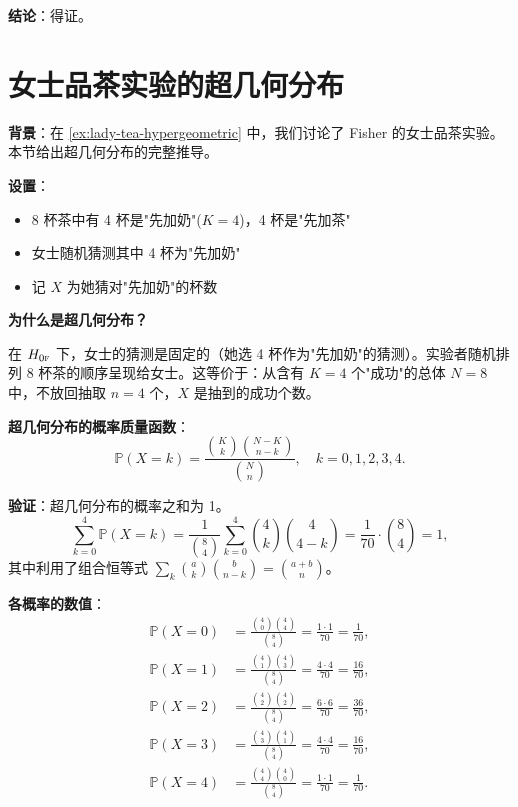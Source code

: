 \textbf{结论}：得证。

\section{女士品茶实验的超几何分布}\label{sec:lady-tea-hypergeometric}\label{ex:lady-tea-hypergeometric}

\textbf{背景}：在 \ref{ex:lady-tea-hypergeometric} 中，我们讨论了 Fisher 的女士品茶实验。本节给出超几何分布的完整推导。

\textbf{设置}：
\begin{itemize}
  \item 8 杯茶中有 4 杯是"先加奶"($K=4$)，4 杯是"先加茶"
  \item 女士随机猜测其中 4 杯为"先加奶"
  \item 记 $X$ 为她猜对"先加奶"的杯数
\end{itemize}

\textbf{为什么是超几何分布？}

在 $H_{0\textsc{f}}$ 下，女士的猜测是固定的（她选 4 杯作为"先加奶"的猜测）。实验者随机排列 8 杯茶的顺序呈现给女士。这等价于：从含有 $K=4$ 个"成功"的总体 $N=8$ 中，不放回抽取 $n=4$ 个，$X$ 是抽到的成功个数。

\textbf{超几何分布的概率质量函数}：
\[
\mathbb{P}(X = k) = \frac{\binom{K}{k} \binom{N-K}{n-k}}{\binom{N}{n}}, \quad k = 0, 1, 2, 3, 4 .
\]

\textbf{验证}：超几何分布的概率之和为 1。
\[
\sum_{k=0}^{4} \mathbb{P}(X = k) = \frac{1}{\binom{8}{4}} \sum_{k=0}^{4} \binom{4}{k} \binom{4}{4-k} = \frac{1}{70} \cdot \binom{8}{4} = 1 ,
\]
其中利用了组合恒等式 $\sum_{k} \binom{a}{k} \binom{b}{n-k} = \binom{a+b}{n}$。

\textbf{各概率的数值}：
\[
\begin{aligned}
\mathbb{P}(X = 0) &= \frac{\binom{4}{0}\binom{4}{4}}{\binom{8}{4}} = \frac{1 \cdot 1}{70} = \frac{1}{70}, \\
\mathbb{P}(X = 1) &= \frac{\binom{4}{1}\binom{4}{3}}{\binom{8}{4}} = \frac{4 \cdot 4}{70} = \frac{16}{70}, \\
\mathbb{P}(X = 2) &= \frac{\binom{4}{2}\binom{4}{2}}{\binom{8}{4}} = \frac{6 \cdot 6}{70} = \frac{36}{70}, \\
\mathbb{P}(X = 3) &= \frac{\binom{4}{3}\binom{4}{1}}{\binom{8}{4}} = \frac{4 \cdot 4}{70} = \frac{16}{70}, \\
\mathbb{P}(X = 4) &= \frac{\binom{4}{4}\binom{4}{0}}{\binom{8}{4}} = \frac{1 \cdot 1}{70} = \frac{1}{70}.
\end{aligned}
\]

